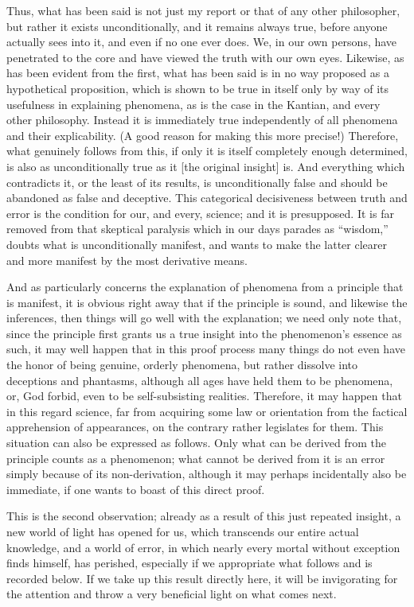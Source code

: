 Thus, what has been said is not just my report
or that of any other philosopher,
but rather it exists unconditionally,
and it remains always true,
before anyone actually sees into it,
and even if no one ever does.
We, in our own persons, have penetrated to the core
and have viewed the truth with our own eyes.
Likewise, as has been evident from the first,
what has been said is in no way proposed
as a hypothetical proposition,
which is shown to be true in itself
only by way of its usefulness in explaining phenomena,
as is the case in the Kantian, and every other philosophy.
Instead it is immediately true independently of
all phenomena and their explicability.
(A good reason for making this more precise!)
Therefore, what genuinely follows from this,
if only it is itself completely enough determined,
is also as unconditionally true as it [the original insight] is.
And everything which contradicts it,
or the least of its results, is unconditionally false
and should be abandoned as false and deceptive.
This categorical decisiveness between truth and error
is the condition for our, and every, science;
and it is presupposed.
It is far removed from that skeptical paralysis
which in our days parades as “wisdom,”
doubts what is unconditionally manifest,
and wants to make the latter clearer
and more manifest by the most derivative means.

And as particularly concerns the explanation
of phenomena from a principle that is manifest,
it is obvious right away that if the principle is sound,
and likewise the inferences,
then things will go well with the explanation;
we need only note that,
since the principle first grants us a true insight
into the phenomenon’s essence as such,
it may well happen that in this proof process
many things do not even have the honor
of being genuine, orderly phenomena,
but rather dissolve into deceptions and phantasms,
although all ages have held them to be phenomena,
or, God forbid, even to be self-subsisting realities.
Therefore, it may happen that in this regard science,
far from acquiring some law or orientation
from the factical apprehension of appearances,
on the contrary rather legislates for them.
This situation can also be expressed as follows.
Only what can be derived from the principle
counts as a phenomenon;
what cannot be derived from it is an error
simply because of its non-derivation,
although it may perhaps incidentally also be immediate,
if one wants to boast of this direct proof.

This is the second observation;
already as a result of this just repeated insight,
a new world of light has opened for us,
which transcends our entire actual knowledge,
and a world of error,
in which nearly every mortal
without exception finds himself,
has perished,
especially if we appropriate
what follows and is recorded below.
If we take up this result directly here,
it will be invigorating for the attention
and throw a very beneficial light
on what comes next.

